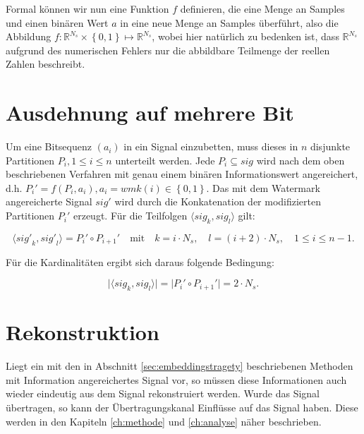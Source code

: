 Formal können wir nun eine Funktion $f$ definieren, die eine Menge an Samples und einen binären Wert $a$ in eine neue Menge an Samples überführt, also die Abbildung $f: {\mathbb{R}}^{{N}_{s}} \times \left\{0,1\right\} \mapsto  {\mathbb{R}}^{{N}_{s}}$, wobei hier natürlich zu bedenken ist, dass ${\mathbb{R}}^{{N}_{s}}$ aufgrund des numerischen Fehlers nur die abbildbare Teilmenge der reellen Zahlen beschreibt. 

\section{Ausdehnung auf mehrere Bit}
\label{sec:embeddingstragety_bitsequence}

Um eine Bitsequenz $({a}_{i})$ in ein Signal einzubetten, muss dieses in $n$ disjunkte Partitionen ${P}_{i}, {1}\leq{i}\leq{n}$ unterteilt werden. Jede ${P}_{i}\subseteq{sig}$ wird nach dem oben beschriebenen Verfahren mit genau einem binären Informationswert angereichert, d.h. ${P}_{i}'=f({P}_{i}, {a}_{i}), {a}_{i} = wmk(i)\in\left\{0,1\right\}$. Das mit dem Watermark angereicherte Signal $sig'$ wird durch die Konkatenation der modifizierten Partitionen ${P}_{i}'$ erzeugt. Für die Teilfolgen $\langle{sig}_{k},{sig}_{l}\rangle$ gilt:

	\begin{equation}
		\langle{sig'}_{k},{sig'}_{l}\rangle = {P}_{i}'\circ{P}_{i+1}' \quad\mbox{mit}\quad k=i \cdot {N}_{s},\quad l=(i+2) \cdot {N}_{s},\quad {1}\leq{i}\leq{n-1}.
		\label{equ:signalconcat}
	\end{equation}

Für die Kardinalitäten ergibt sich daraus folgende Bedingung:

	\begin{equation}
 	   \vert\langle{sig}_{k},{sig}_{l}\rangle\vert = \vert{P}_{i}'\circ{P}_{i+1}'\vert = 2 \cdot {N}_{s}.
	   \label{equ:signalcardinality}
	\end{equation}

\section{Rekonstruktion}
\label{sec:reconstruction}

Liegt ein mit den in Abschnitt \ref{sec:embeddingstragety} beschriebenen Methoden mit Information angereichertes Signal vor, so müssen diese Informationen auch wieder eindeutig aus dem Signal rekonstruiert werden. Wurde das Signal übertragen, so kann der Übertragungskanal Einflüsse auf das Signal haben. Diese werden in den Kapiteln \ref{ch:methode} und \ref{ch:analyse} näher beschrieben. 

